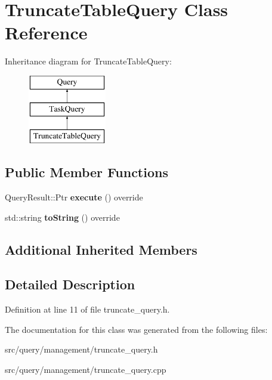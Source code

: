 \hypertarget{class_truncate_table_query}{}\section{Truncate\+Table\+Query Class Reference}
\label{class_truncate_table_query}
Inheritance diagram for Truncate\+Table\+Query\+:\begin{figure}[H]
\begin{center}
\leavevmode
\includegraphics[height=3.000000cm]{class_truncate_table_query}
\end{center}
\end{figure}
\subsection*{Public Member Functions}
\begin{DoxyCompactItemize}
\item 
\mbox{\label{class_truncate_table_query_abfdabfe64ed8ab5e65a62e8ef5a52364}} 
Query\+Result\+::\+Ptr {\bfseries execute} () override
\item 
\mbox{\label{class_truncate_table_query_add48943cfe7d329cb26e9521fe4634fb}} 
std\+::string {\bfseries to\+String} () override
\end{DoxyCompactItemize}
\subsection*{Additional Inherited Members}


\subsection{Detailed Description}


Definition at line 11 of file truncate\+\_\+query.\+h.



The documentation for this class was generated from the following files\+:\begin{DoxyCompactItemize}
\item 
src/query/management/truncate\+\_\+query.\+h\item 
src/query/management/truncate\+\_\+query.\+cpp\end{DoxyCompactItemize}
